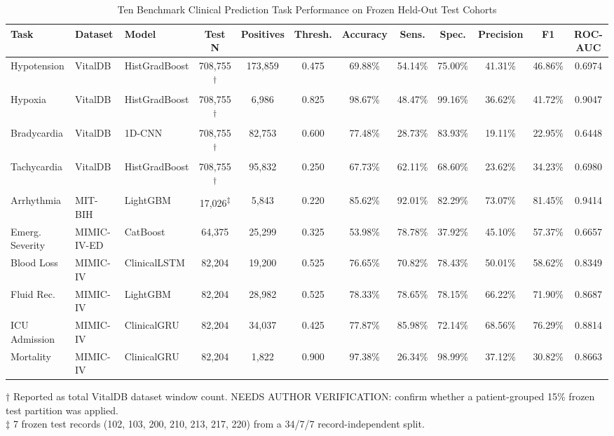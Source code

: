 \documentclass[conference]{IEEEtran}
\begin{document}
\begin{table}[t]
\centering
\caption{Ten Benchmark Clinical Prediction Task Performance on Frozen Held-Out Test Cohorts}
\label{tab:results}
\begin{tabularx}{\textwidth}{l l l c c c c c c c c c}
\toprule
\textbf{Task} & \textbf{Dataset} & \textbf{Model} & \textbf{Test N} & \textbf{Positives} & \textbf{Thresh.} & \textbf{Accuracy} & \textbf{Sens.} & \textbf{Spec.} & \textbf{Precision} & \textbf{F1} & \textbf{ROC-AUC} \\
\midrule
Hypotension & VitalDB & HistGradBoost & 708,755\textsuperscript{$\dagger$} & 173,859 & 0.475 & 69.88\% & 54.14\% & 75.00\% & 41.31\% & 46.86\% & 0.6974 \\
Hypoxia & VitalDB & HistGradBoost & 708,755\textsuperscript{$\dagger$} & 6,986 & 0.825 & 98.67\% & 48.47\% & 99.16\% & 36.62\% & 41.72\% & 0.9047 \\
Bradycardia & VitalDB & 1D-CNN & 708,755\textsuperscript{$\dagger$} & 82,753 & 0.600 & 77.48\% & 28.73\% & 83.93\% & 19.11\% & 22.95\% & 0.6448 \\
Tachycardia & VitalDB & HistGradBoost & 708,755\textsuperscript{$\dagger$} & 95,832 & 0.250 & 67.73\% & 62.11\% & 68.60\% & 23.62\% & 34.23\% & 0.6980 \\
Arrhythmia & MIT-BIH & LightGBM & 17,026\textsuperscript{$\ddagger$} & 5,843 & 0.220 & 85.62\% & 92.01\% & 82.29\% & 73.07\% & 81.45\% & 0.9414 \\
Emerg. Severity & MIMIC-IV-ED & CatBoost & 64,375 & 25,299 & 0.325 & 53.98\% & 78.78\% & 37.92\% & 45.10\% & 57.37\% & 0.6657 \\
Blood Loss & MIMIC-IV & ClinicalLSTM & 82,204 & 19,200 & 0.525 & 76.65\% & 70.82\% & 78.43\% & 50.01\% & 58.62\% & 0.8349 \\
Fluid Rec. & MIMIC-IV & LightGBM & 82,204 & 28,982 & 0.525 & 78.33\% & 78.65\% & 78.15\% & 66.22\% & 71.90\% & 0.8687 \\
ICU Admission & MIMIC-IV & ClinicalGRU & 82,204 & 34,037 & 0.425 & 77.87\% & 85.98\% & 72.14\% & 68.56\% & 76.29\% & 0.8814 \\
Mortality & MIMIC-IV & ClinicalGRU & 82,204 & 1,822 & 0.900 & 97.38\% & 26.34\% & 98.99\% & 37.12\% & 30.82\% & 0.8663 \\
\bottomrule
\end{tabularx}
\footnotesize{$\dagger$ Reported as total VitalDB dataset window count. NEEDS AUTHOR VERIFICATION: confirm whether a patient-grouped 15\% frozen test partition was applied.\\
$\ddagger$ 7 frozen test records (102, 103, 200, 210, 213, 217, 220) from a 34/7/7 record-independent split.}
\end{table}
\end{document}
